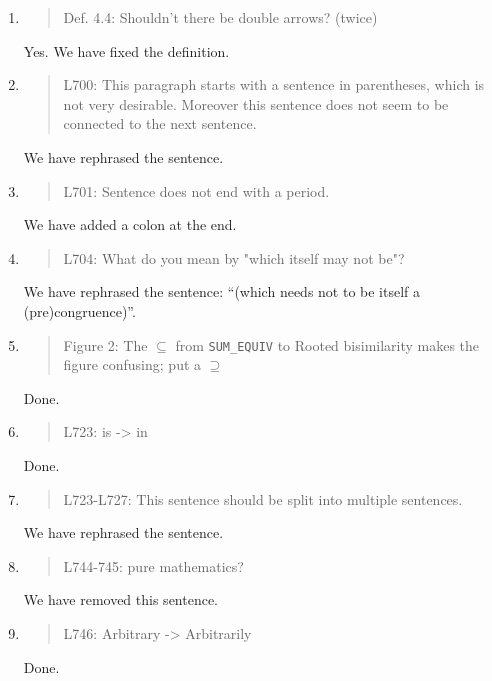 \begin{enumerate}
\item \begin{quote}
    Def. 4.4: Shouldn’t there be double arrows? (twice)
  \end{quote}
  Yes. We have fixed the definition.
  
\item \begin{quote}
    L700: This paragraph starts with a sentence in parentheses, which is not very desirable.
    Moreover this sentence does not seem to be connected to the next sentence.
  \end{quote}
  We have rephrased the sentence.
  
\item \begin{quote}
    L701: Sentence does not end with a period.
  \end{quote}
  We have added a colon at the end.
  
\item \begin{quote}
    L704: What do you mean by "which itself may not be"?
  \end{quote}
  We have rephrased the sentence: ``(which needs not to be itself a (pre)congruence)''.

\item \begin{quote}
    Figure 2: The $\subseteq$ from \texttt{SUM\_EQUIV} to Rooted
    bisimilarity makes the figure confusing; put a $\supseteq$
  \end{quote}
  Done.
  
\item \begin{quote}
    L723: is -> in
  \end{quote}
  Done.
  
\item \begin{quote}
    L723-L727: This sentence should be split into multiple sentences.
  \end{quote}
  We have rephrased the sentence.
  
\item \begin{quote}
    L744-745: pure mathematics?
  \end{quote}
  We have removed this sentence.
  
\item \begin{quote}
    L746: Arbitrary -> Arbitrarily
  \end{quote}
  Done.
  

\end{enumerate}
